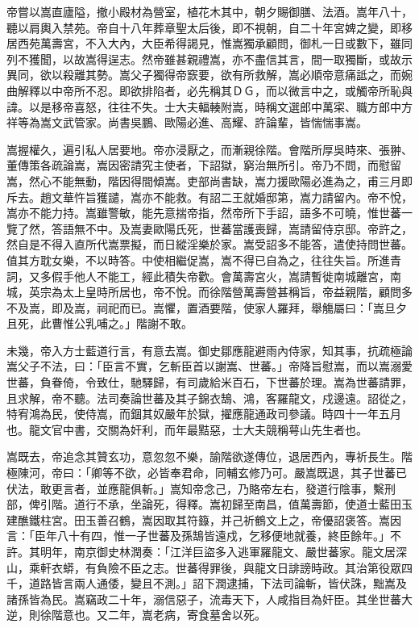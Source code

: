 \begin{pinyinscope}
帝嘗以嵩直廬隘，撤小殿材為營室，植花木其中，朝夕賜御膳、法酒。嵩年八十，聽以肩輿入禁苑。帝自十八年葬章聖太后後，即不視朝，自二十年宮婢之變，即移居西苑萬壽宮，不入大內，大臣希得謁見，惟嵩獨承顧問，御札一日或數下，雖同列不獲聞，以故嵩得逞志。然帝雖甚親禮嵩，亦不盡信其言，間一取獨斷，或故示異同，欲以殺離其勢。嵩父子獨得帝窾要，欲有所救解，嵩必順帝意痛詆之，而婉曲解釋以中帝所不忍。即欲排陷者，必先稱其ＤＧ，而以微言中之，或觸帝所恥與諱。以是移帝喜怒，往往不失。士大夫輻輳附嵩，時稱文選郎中萬寀、職方郎中方祥等為嵩文武管家。尚書吳鵬、歐陽必進、高耀、許論輩，皆惴惴事嵩。

嵩握權久，遍引私人居要地。帝亦浸厭之，而漸親徐階。會階所厚吳時來、張翀、董傳策各疏論嵩，嵩因密請究主使者，下詔獄，窮治無所引。帝乃不問，而慰留嵩，然心不能無動，階因得間傾嵩。吏部尚書缺，嵩力援歐陽必進為之，甫三月即斥去。趙文華忤旨獲譴，嵩亦不能救。有詔二王就婚邸第，嵩力請留內。帝不悅，嵩亦不能力持。嵩雖警敏，能先意揣帝指，然帝所下手詔，語多不可曉，惟世蕃一覽了然，答語無不中。及嵩妻歐陽氏死，世蕃當護喪歸，嵩請留侍京邸。帝許之，然自是不得入直所代嵩票擬，而日縱淫樂於家。嵩受詔多不能答，遣使持問世蕃。值其方耽女樂，不以時答。中使相繼促嵩，嵩不得已自為之，往往失旨。所進青詞，又多假手他人不能工，經此積失帝歡。會萬壽宮火，嵩請暫徙南城離宮，南城，英宗為太上皇時所居也，帝不悅。而徐階營萬壽營甚稱旨，帝益親階，顧問多不及嵩，即及嵩，祠祀而已。嵩懼，置酒要階，使家人羅拜，舉觴屬曰：「嵩旦夕且死，此曹惟公乳哺之。」階謝不敢。

未幾，帝入方士藍道行言，有意去嵩。御史鄒應龍避雨內侍家，知其事，抗疏極論嵩父子不法，曰：「臣言不實，乞斬臣首以謝嵩、世蕃。」帝降旨慰嵩，而以嵩溺愛世蕃，負眷倚，令致仕，馳驛歸，有司歲給米百石，下世蕃於理。嵩為世蕃請罪，且求解，帝不聽。法司奏論世蕃及其子錦衣鵠、鴻，客羅龍文，戍邊遠。詔從之，特宥鴻為民，使侍嵩，而錮其奴嚴年於獄，擢應龍通政司參議。時四十一年五月也。龍文官中書，交關為奸利，而年最黠惡，士大夫競稱萼山先生者也。

嵩既去，帝追念其贊玄功，意忽忽不樂，諭階欲遂傳位，退居西內，專祈長生。階極陳河，帝曰：「卿等不欲，必皆奉君命，同輔玄修乃可。嚴嵩既退，其子世蕃已伏法，敢更言者，並應龍俱斬。」嵩知帝念己，乃賂帝左右，發道行陰事，繫刑部，俾引階。道行不承，坐論死，得釋。嵩初歸至南昌，值萬壽節，使道士藍田玉建醮鐵柱宮。田玉善召鶴，嵩因取其符籙，并己祈鶴文上之，帝優詔褒答。嵩因言：「臣年八十有四，惟一子世蕃及孫鵠皆遠戍，乞移便地就養，終臣餘年。」不許。其明年，南京御史林潤奏：「江洋巨盜多入逃軍羅龍文、嚴世蕃家。龍文居深山，乘軒衣蟒，有負險不臣之志。世蕃得罪後，與龍文日誹謗時政。其治第役眾四千，道路皆言兩人通倭，變且不測。」詔下潤逮捕，下法司論斬，皆伏誅，黜嵩及諸孫皆為民。嵩竊政二十年，溺信惡子，流毒天下，人咸指目為奸臣。其坐世蕃大逆，則徐階意也。又二年，嵩老病，寄食墓舍以死。


\end{pinyinscope}
